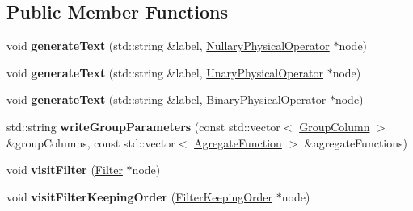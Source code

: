 \subsection*{Public Member Functions}
\begin{DoxyCompactItemize}
\item 
\hypertarget{class_physical_operator_drawing_visitor_a50acb8aae6d2b5fffff964f7d84b079f}{void {\bfseries generate\+Text} (std\+::string \&label, \hyperlink{class_nullary_physical_operator}{Nullary\+Physical\+Operator} $\ast$node)}\label{class_physical_operator_drawing_visitor_a50acb8aae6d2b5fffff964f7d84b079f}

\item 
\hypertarget{class_physical_operator_drawing_visitor_ab2637eab548a1c1d832a877363ede4a9}{void {\bfseries generate\+Text} (std\+::string \&label, \hyperlink{class_unary_physical_operator}{Unary\+Physical\+Operator} $\ast$node)}\label{class_physical_operator_drawing_visitor_ab2637eab548a1c1d832a877363ede4a9}

\item 
\hypertarget{class_physical_operator_drawing_visitor_a3abc3dcacc46a1004f7a9fb26f56154b}{void {\bfseries generate\+Text} (std\+::string \&label, \hyperlink{class_binary_physical_operator}{Binary\+Physical\+Operator} $\ast$node)}\label{class_physical_operator_drawing_visitor_a3abc3dcacc46a1004f7a9fb26f56154b}

\item 
\hypertarget{class_physical_operator_drawing_visitor_a4729d5a2f38e5318f44149942fb8e3c3}{std\+::string {\bfseries write\+Group\+Parameters} (const std\+::vector$<$ \hyperlink{class_group_column}{Group\+Column} $>$ \&group\+Columns, const std\+::vector$<$ \hyperlink{class_agregate_function}{Agregate\+Function} $>$ \&agregate\+Functions)}\label{class_physical_operator_drawing_visitor_a4729d5a2f38e5318f44149942fb8e3c3}

\item 
\hypertarget{class_physical_operator_drawing_visitor_af5a712a2a8dac447846849d91d20821e}{void {\bfseries visit\+Filter} (\hyperlink{class_filter}{Filter} $\ast$node)}\label{class_physical_operator_drawing_visitor_af5a712a2a8dac447846849d91d20821e}

\item 
\hypertarget{class_physical_operator_drawing_visitor_a0e517a5b635ad9dd2624ca2ac5f623e6}{void {\bfseries visit\+Filter\+Keeping\+Order} (\hyperlink{class_filter_keeping_order}{Filter\+Keeping\+Order} $\ast$node)}\label{class_physical_operator_drawing_visitor_a0e517a5b635ad9dd2624ca2ac5f623e6}


\end{DoxyCompactItemize}

